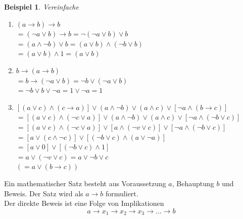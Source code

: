 \documentclass{report}
\newtheorem{myexample}{Beispiel}
\begin{document}
\begin{myexample}Vereinfache
\begin{enumerate}
\item $(a \to b) \to b$\\
$= (\lnot a \lor b) \to b = \lnot(\lnot a \lor b) \lor b$\\
$= (a \land \lnot b) \lor b = (a \lor b) \land (\lnot b \lor b)$\\
$= (a \lor b) \land 1 = (a \lor b)$
\item $b \to (a \to b)$\\
$= b \to (\lnot a \lor b) = \lnot b \lor (\lnot a \lor b)$\\
$= \lnot b \lor b \lor \lnot a = 1 \lor \lnot a = 1$
\item $[(a \lor c) \land (c \to a)] \lor (a \land \lnot b) \lor (a \land c) \lor [\lnot a \land (b \to c)]$\\
$=[(a \lor c) \land (\lnot c \lor a)] \lor (a \land \lnot b) \lor (a \land c) \lor [\lnot a \land (\lnot b \lor c)]$\\
$=[(a \lor c) \land (\lnot c \lor a)] \lor [a \land (\lnot v \lor c)] \lor [\lnot a \land (\lnot b \lor c)]$\\
$=[a \lor (c \land \lnot c)] \lor [(\lnot b \lor c) \land (a \lor \lnot a)]$\\
$=[a \lor 0] \lor [(\lnot b \lor c) \land 1]$\\
$=a \lor (\lnot v \lor c) = a \lor \lnot b \lor c$\\
$(=a \lor (b \to c))$
\end{enumerate}
\end{myexample}
Ein mathematischer Satz besteht aus Voraussetzung $a$, Behauptung $b$ und Beweis. Der Satz wird als $a \to b$ formuliert.\\
Der direkte Beweis ist eine Folge von Implikationen
\begin{equation}a \to x_1 \to x_2 \to x_3 \to ... \to b\end{equation}
\end{document}
